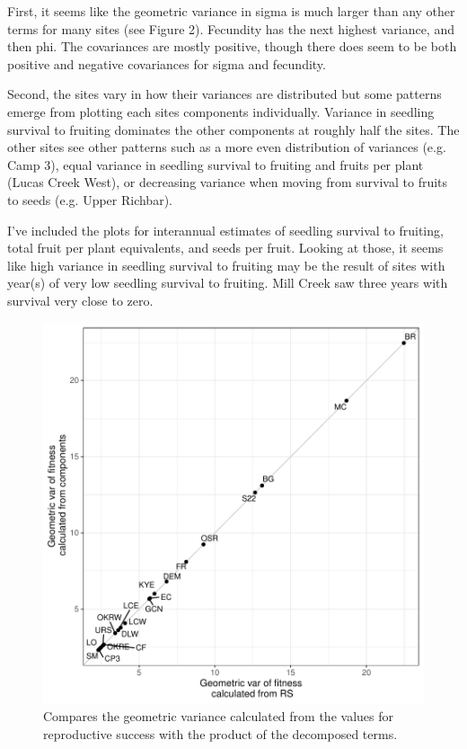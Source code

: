 \documentclass[12pt, oneside, titlepage]{article}   	%
\begin{document}
First, it seems like the geometric variance in sigma is much larger than any other terms for many sites (see Figure 2). Fecundity has the next highest variance, and then phi. The covariances are mostly positive, though there does seem to be both positive and negative covariances for sigma and fecundity.

Second, the sites vary in how their variances are distributed but some patterns emerge from plotting each sites components individually. Variance in seedling survival to fruiting dominates the other components at roughly half the sites. The other sites see other patterns such as a more even distribution of variances (e.g. Camp 3), equal variance in seedling survival to fruiting and fruits per plant (Lucas Creek West), or decreasing variance when moving from survival to fruits to seeds (e.g. Upper Richbar).

I've included the plots for interannual estimates of seedling survival to fruiting, total fruit per plant equivalents, and seeds per fruit. Looking at those, it seems like high variance in seedling survival to fruiting may be the result of sites with year(s) of very low seedling survival to fruiting. Mill Creek saw three years with survival very close to zero.



 \begin{figure}[h]
   \centering
       \includegraphics[page=1,width=1\textwidth]{../../figures/appendix/varianceDecomp/comparison.pdf}  
    \caption{ Compares the geometric variance calculated from the values for reproductive success with the product of the decomposed terms. }
 \label{fig:test}
\end{figure}
\end{document}
